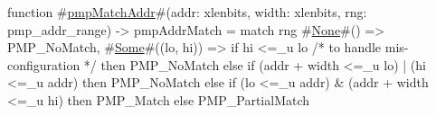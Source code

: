 function #\hyperref[sailRISCVzpmpMatchAddr]{pmpMatchAddr}#(addr: xlenbits, width: xlenbits, rng: pmp_addr_range) -> pmpAddrMatch = {
  match rng {
    #\hyperref[sailRISCVzNone]{None}#()         => PMP_NoMatch,
    #\hyperref[sailRISCVzSome]{Some}#((lo, hi)) => if   hi <=_u lo   /* to handle mis-configuration */
                      then PMP_NoMatch
                      else {
                        if      (addr + width <=_u lo) | (hi <=_u addr)
                        then    PMP_NoMatch
                        else if (lo <=_u addr) & (addr + width <=_u hi)
                        then    PMP_Match
                        else    PMP_PartialMatch
                      }
  }
}
